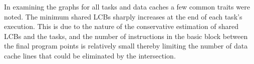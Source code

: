 %
%
%
%
%
%
%
%
%
%
%
%
%
%
%

In examining the graphs for all tasks and data caches a few common traits were noted. The minimum shared LCBs sharply increases at the end of each task's execution. This is due to the nature of the conservative estimation of shared LCBs and the tasks, and the number of instructions in the basic block between the final program points is relatively small thereby limiting the number of data cache lines that could be eliminated by the intersection.
%

